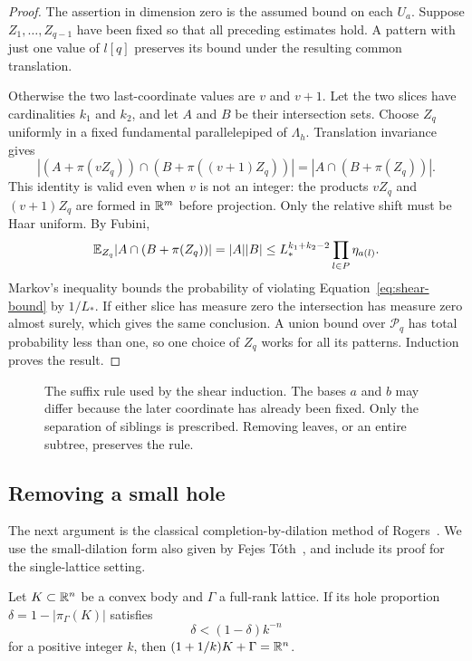 \begin{proof}
The assertion in dimension zero is the assumed bound on each $U_a$.
Suppose $Z_1,\ldots,Z_{q-1}$ have been fixed so that all preceding
estimates hold. A pattern with just one value of $l[q]$ preserves its
bound under the resulting common translation.

Otherwise the two last-coordinate values are $v$ and $v+1$.
Let the two slices have cardinalities $k_1$ and $k_2$, and let $A$ and
$B$ be their intersection sets. Choose $Z_q$ uniformly in a fixed
fundamental parallelepiped of $\Lambda_h$. Translation invariance gives
\[
 |(A+\pi(vZ_q))\cap(B+\pi((v+1)Z_q))|
       =|A\cap(B+\pi(Z_q))|.
\]
This identity is valid even when $v$ is not an integer: the products
$vZ_q$ and $(v+1)Z_q$ are formed in $\mathbb R^m$ before projection.
Only the relative shift must be Haar uniform. By Fubini,
\[
 \mathbb E_{Z_q}|A\cap(B+\pi(Z_q))|=|A||B|
 \le L_*^{k_1+k_2-2}\prod_{l\in P}\eta_{a(l)}.
\]
Markov's inequality bounds the probability of violating
Equation~\eqref{eq:shear-bound} by $1/L_*$. If either slice has
measure zero the intersection has measure zero almost surely,
which gives the same conclusion. A union bound over
$\mathcal P_q$ has total probability less than one, so one choice of
$Z_q$ works for all its patterns. Induction proves the result.
\end{proof}

\begin{figure}[htbp]
\centering

\caption{The suffix rule used by the shear induction. The bases $a$ and
$b$ may differ because the later coordinate has already been fixed.
Only the separation of siblings is prescribed. Removing leaves, or an
entire subtree, preserves the rule.}
\label{fig:suffix-tree}
\end{figure}

\subsection{Removing a small hole}

The next argument is the classical completion-by-dilation method of
Rogers~\cite{Rog59}. We use the small-dilation form also given by
Fejes T\'oth~\cite[Lemma~2]{FT09}, and include its proof for the
single-lattice setting.

\begin{lemma}[Completion]\label{lem:completion}
Let $K\subset\mathbb R^n$ be a convex body and $\Gamma$ a full-rank lattice.
If its hole proportion $\delta=1-|\pi_\Gamma(K)|$ satisfies
\[
 \delta<(1-\delta)k^{-n}
\]
for a positive integer $k$, then $(1+1/k)K+\Gamma=\mathbb R^n$.
\end{lemma}

